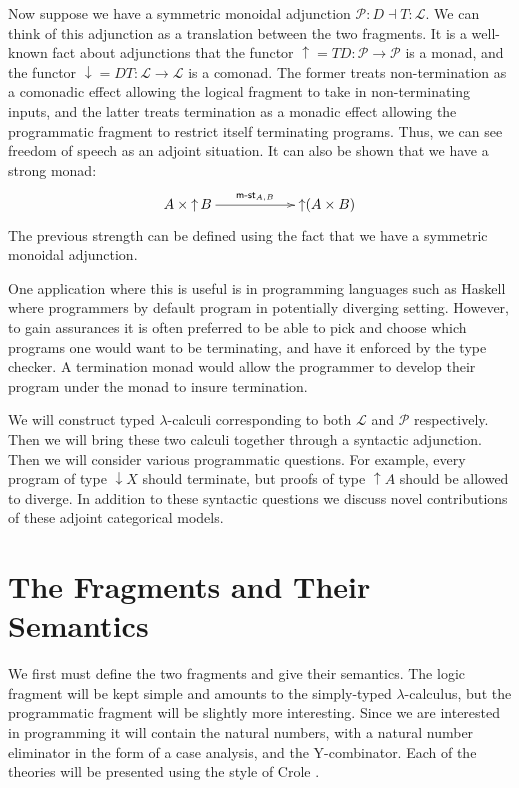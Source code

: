 \documentclass{article}
\let\to\rightarrow
\newcommand{\cat}[1]{\mathcal{#1}}
\newcommand{\uar}[0]{\mathop{\uparrow}}
\newcommand{\dar}[0]{\mathop{\downarrow}}
\newcommand{\mst}[1]{\mathsf{m\text{-}st}_{#1}}
\begin{document}
Now suppose we have a symmetric monoidal adjunction $\cat{P} : D
\dashv T : \cat{L}$. We can think of this adjunction as a translation
between the two fragments.  It is a well-known fact about adjunctions
that the functor $\uar = TD : \cat{P} \to \cat{P}$ is a monad, and the
functor $\dar = DT : \cat{L} \to \cat{L}$ is a comonad.  The former
treats non-termination as a comonadic effect allowing the logical
fragment to take in non-terminating inputs, and the latter treats
termination as a monadic effect allowing the programmatic fragment to
restrict itself terminating programs.  Thus, we can see freedom of
speech as an adjoint situation.  It can also be shown that we have a
strong monad:
\[
\bfig
\morphism<1000,0>[A \times \uar B`\uar(A \times B);\mst{A,B}]
\efig
\]
The previous strength can be defined using the fact that we have a
symmetric monoidal adjunction.

One application where this is useful is in programming languages such
as Haskell where programmers by default program in potentially
diverging setting.  However, to gain assurances it is often preferred
to be able to pick and choose which programs one would want to be
terminating, and have it enforced by the type checker.  A termination
monad would allow the programmer to develop their program under the
monad to insure termination.

We will construct typed $\lambda$-calculi corresponding to both
$\cat{L}$ and $\cat{P}$ respectively.  Then we will bring these two
calculi together through a syntactic adjunction.  Then we will
consider various programmatic questions.  For example, every program
of type $\dar X$ should terminate, but proofs of type $\uar A$ should
be allowed to diverge.  In addition to these syntactic questions we
discuss novel contributions of these adjoint categorical models.

\section{The Fragments and Their Semantics}
\label{sec:the_fragments_and_their_semantics}

We first must define the two fragments and give their semantics.  The
logic fragment will be kept simple and amounts to the simply-typed
$\lambda$-calculus, but the programmatic fragment will be slightly
more interesting.  Since we are interested in programming it will
contain the natural numbers, with a natural number eliminator in the
form of a case analysis, and the Y-combinator.  Each of the theories
will be presented using the style of Crole \cite{??}.
\end{document}
